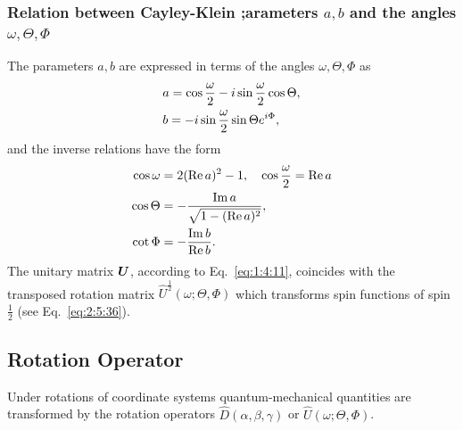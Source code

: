\subsubsection{Relation between Cayley-Klein ;arameters \(a, b\) and the angles \(\omega, \Theta, \Phi\)}

The parameters \(a, b\) are expressed in terms of the angles \(\omega, \Theta, \Phi\) as
\begin{align}
& a=\cos \frac{\omega}{2}-i \sin \frac{\omega}{2} \cos \Theta , \label{eq:1:4:26}\\
& b=-i \sin \frac{\omega}{2} \sin \Theta e^{i \Phi} \notag,
\end{align}
and the inverse relations have the form
\begin{align}
\cos \omega & =2(\Re  a)^{2}-1, \quad \cos \frac{\omega}{2}=\Re  a  \notag\\
\cos \Theta & =-\frac{\Im  a}{\sqrt{1-(\Re  a)^{2}}}  ,\label{eq:1:4:27}\\
\cot \Phi & =-\frac{\Im  b}{\Re  b} \notag .
\end{align}
The unitary matrix \(\mat U\), according to Eq.~\eqref{eq:1:4:11}, coincides with the transposed rotation matrix \(\widehat{U}^{\frac{1}{2}}(\omega ; \Theta, \Phi)\) which transforms spin functions of spin \(\frac{1}{2}\) (see Eq.~\eqref{eq:2:5:36}).

\subsection{Rotation Operator}\label{sec:1.4.5}
Under rotations of coordinate systems quantum-mechanical quantities are transformed by the rotation operators \(\widehat{D}(\alpha, \beta, \gamma)\) or \(\widehat{U}(\omega ; \Theta, \Phi)\).

